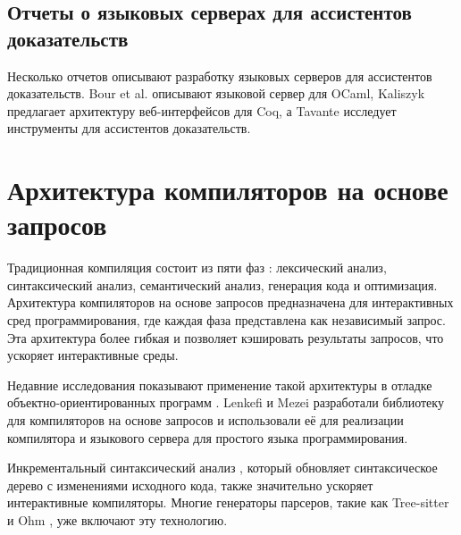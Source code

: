 \subsection{Отчеты о языковых серверах для ассистентов доказательств}

Несколько отчетов описывают разработку языковых серверов для ассистентов доказательств. Bour et al. \cite{Bour2018} описывают языковой сервер для OCaml, Kaliszyk \cite{Kaliszyk2007} предлагает архитектуру веб-интерфейсов для Coq, а Tavante \cite{Tavante2021} исследует инструменты для ассистентов доказательств.

\section{Архитектура компиляторов на основе запросов}

Традиционная компиляция состоит из пяти фаз \cite{dragon-book}: лексический анализ, синтаксический анализ, семантический анализ, генерация кода и оптимизация. Архитектура компиляторов на основе запросов \cite{ollef-rock} предназначена для интерактивных сред программирования, где каждая фаза представлена как независимый запрос. Эта архитектура более гибкая и позволяет кэшировать результаты запросов, что ускоряет интерактивные среды.

Недавние исследования показывают применение такой архитектуры в отладке объектно-ориентированных программ \cite{Lencevicius1997}. Lenkefi и Mezei \cite{icsoft22} разработали библиотеку для компиляторов на основе запросов и использовали её для реализации компилятора и языкового сервера для простого языка программирования.

Инкрементальный синтаксический анализ \cite{Ghezzi1979, diekmann2019editing, Wagner1998}, который обновляет синтаксическое дерево с изменениями исходного кода, также значительно ускоряет интерактивные компиляторы. Многие генераторы парсеров, такие как Tree-sitter \cite{tree-sitter} и Ohm \cite{Dubroy2017}, уже включают эту технологию.
